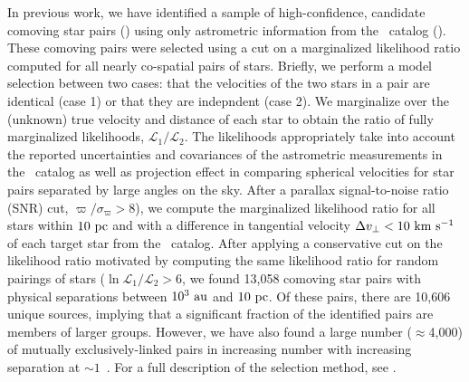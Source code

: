 \documentclass[modern, letterpaper]{aastex61}
\newcommand{\tgas}{\acronym{TGAS}}
\begin{document}
In previous work, we have identified a sample of high-confidence, candidate
comoving star pairs (\citealt{Oh:2017}) using only astrometric information from
the \tgas\ catalog (\citealt{Michalik:2015,Gaia-Collaboration:2016a}).
These comoving pairs were selected using a cut on a marginalized likelihood
ratio computed for all nearly co-spatial pairs of stars.
Briefly, we perform a model selection between
two cases: that the velocities of the two stars in a pair are
identical (case 1) or that they are indepndent (case 2).
We marginalize over the (unknown) true velocity and distance of each star
to obtain the ratio of fully marginalized likelihoods,
$\mathcal{L}_1/\mathcal{L}_2$.
The likelihoods appropriately take into account the reported uncertainties and
covariances of the astrometric measurements in the \tgas\ catalog
as well as projection effect in comparing spherical
velocities for star pairs separated by large angles on the sky.
After a parallax signal-to-noise ratio (SNR) cut, $\varpi/\sigma_\varpi > 8$),
we compute the marginalized likelihood ratio for all stars within $10~\mathrm{pc}$ and
with a difference in tangential velocity $\Delta v_\perp < 10~\mathrm{km}~\mathrm{s}^{-1}$ of each
target star from the \tgas\ catalog.
After applying a conservative cut on the likelihood ratio motivated by computing
the same likelihood ratio for random pairings of stars ($\ln
\mathcal{L}_1/\mathcal{L}_2 > 6$, we found 13,058 comoving star pairs with
physical separations between $10^3~\mathrm{au}$ and $10~\mathrm{pc}$.
Of these pairs, there are 10,606 unique sources, implying that a significant
fraction of the identified pairs are members of larger groups.
However, we have also found a large number ($\approx$4,000) of mutually
exclusively-linked pairs in increasing number with increasing separation at
$\sim 1$~\pc.
For a full description of the selection method, see \citealt{Oh:2017}.
\end{document}
